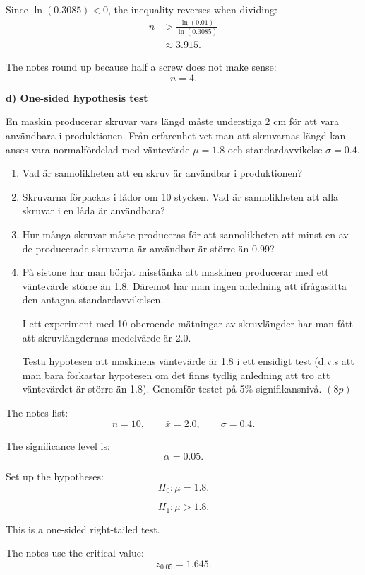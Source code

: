 \documentclass[10pt]{article}
\begin{document}
Since \(\ln(0.3085)<0\), the inequality reverses
when dividing:
\begin{align*}
n
&>
\frac{\ln(0.01)}{\ln(0.3085)}
\\[2mm]
&\approx
3.915.
\end{align*}

The notes round up because half a screw does not make
sense:
\[
n=4.
\]

\textbf{d) One-sided hypothesis test}

En maskin producerar skruvar vars längd måste
understiga 2 cm för att vara användbara i
produktionen. Från erfarenhet vet man att skruvarnas
längd kan anses vara normalfördelad med väntevärde
\(\mu=1.8\) och standardavvikelse \(\sigma=0.4\).

\begin{enumerate}[label=\alph*)]
\item Vad är sannolikheten att en skruv är användbar
i produktionen?

\item Skruvarna förpackas i lådor om 10 stycken.
Vad är sannolikheten att alla skruvar i en låda är
användbara?

\item Hur många skruvar måste produceras för att
sannolikheten att minst en av de producerade
skruvarna är användbar är större än 0.99?

\item På sistone har man börjat misstänka att
maskinen producerar med ett väntevärde större än
1.8. Däremot har man ingen anledning att ifrågasätta
den antagna standardavvikelsen.

I ett experiment med 10 oberoende mätningar av
skruvlängder har man fått att skruvlängdernas
medelvärde är 2.0.

Testa hypotesen att maskinens väntevärde är 1.8 i
ett ensidigt test (d.v.s att man bara förkastar
hypotesen om det finns tydlig anledning att tro att
väntevärdet är större än 1.8). Genomför testet på
5\% signifikansnivå. \((8p)\)
\end{enumerate}

The notes list:
\[
n=10,
\qquad
\bar{x}=2.0,
\qquad
\sigma=0.4.
\]

The significance level is:
\[
\alpha=0.05.
\]

Set up the hypotheses:
\[
H_0:\mu=1.8.
\]

\[
H_1:\mu>1.8.
\]

This is a one-sided right-tailed test.

The notes use the critical value:
\[
z_{0.05}=1.645.
\]
\end{document}
